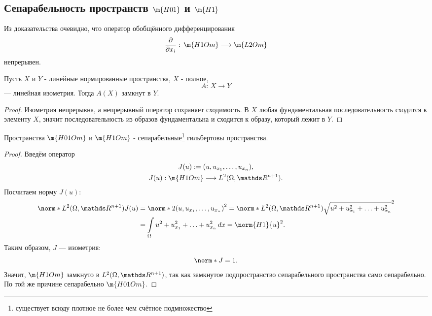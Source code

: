 \subsection{Сепарабельность пространств $\m{H01}$ и $\m{H1}$}

\begin{note} Из доказательства очевидно, что оператор обобщённого дифференцирования
$$ \pder{x_i}: \, \m{H1Om} \longrightarrow \m{L2Om}$$
непрерывен.
\end{note}

\begin{reminder} Пусть $X$ и $Y$ - линейные нормированные пространства, $X$ - полное, 
$$A: \, X \longrightarrow Y$$
--- линейная изометрия. Тогда $A(X)$ замкнут в $Y$.
\end{reminder}
\begin{proof}
Изометрия непрерывна, а непрерывный оператор сохраняет сходимость. В $X$ любая фундаментальная последовательность сходится к элементу $X$, значит последовательность из образов фундаментальна и сходится к образу, который лежит в $Y$.

\end{proof}

\begin{theorem} Пространства $\m{H01Om}$ и $\m{H1Om}$ - сепарабельные\footnote{существует всюду плотное не более чем счётное подмножество} гильбертовы пространства.
\end{theorem}
\begin{proof}
Введём оператор
\begin{gather*}
J(u) := (u, u_{x_1}, \hdots, u_{x_n}), \\ 
J(u):  \m{H1Om} \longrightarrow L^2(\Omega, \real^{n+1}).
\end{gather*}
Посчитаем норму $J(u)$:
\begin{align*}
	\norm*{L^2(\Omega, \real^{n+1})} {J(u)} &= \norm*{2}{(u, u_{x_1}, \hdots, u_{x_n})}^2 = \norm*{L^2(\Omega, \real^{n+1})}{\sqrt{u^2 + u_{x_1}^2 + \hdots + u_{x_n}^2 }}^2 \\
	&= \int \limits_\Omega u^2 + u_{x_1}^2 + \hdots + u_{x_n}^2 \, dx = \norm{H1}{u}^2.
\end{align*}
Таким образом, $J$ --- изометрия:
$$ \norm*{}{J} = 1.$$
Значит, $\m{H1Om}$ замкнуто в $L^2(\Omega, \real^{n+1})$, так как замкнутое подпространство сепарабельного пространства само сепарабельно. По той же причине сепарабельно $\m{H01Om}$.

\end{proof}

